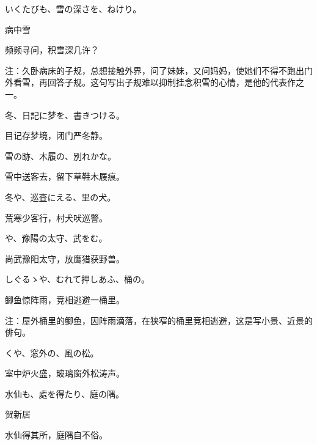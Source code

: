 \begin{haiku}
    {\FH いくたびも、雪の深さを、ねけり。}

    {\FK 病中雪}

    {\FK 频频寻问，积雪深几许？}

    {\FT 注：久卧病床的子规，总想接触外界，问了妹妹，又问妈妈，使她们不得不跑出门外看雪，再回答子规。这句写出子规难以抑制挂念积雪的心情，是他的代表作之一。}
\end{haiku}

\begin{haiku}
    {\FH 冬、日記に梦を、書きつける。}

    {\FK 目记存梦境，闭门严冬静。}
\end{haiku}

\begin{haiku}
    {\FH 雪の跡、木履の、別れかな。}

    {\FK 雪中送客去，留下草鞋木屐痕。}
\end{haiku}

\begin{haiku}
    {\FH 冬や、巡査にえる、里の犬。}

    {\FK 荒寒少客行，村犬吠巡警。}
\end{haiku}

\begin{haiku}
    {\FH {}や、豫陽の太守、武をむ。}

    {\FK 尚武豫阳太守，放鹰猎获野兽。}
\end{haiku}

\begin{haiku}
    {\FH しぐるゝや、むれて押しあふ、桶の。}

    {\FK 鲫鱼惊阵雨，竞相逃避一桶里。}

    {\FT 注：屋外桶里的鲫鱼，因阵雨滴落，在狭窄的桶里竞相逃避，这是写小景、近景的俳句。}
\end{haiku}

\begin{haiku}
    {\FH {}くや、窓外の、風の松。}

    {\FK 室中炉火盛，玻璃窗外松涛声。}
\end{haiku}

\begin{haiku}
    {\FH 水仙も、處を得たり、庭の隅。}

    {\FK 贺新居}

    {\FK 水仙得其所，庭隅自不俗。}
\end{haiku}

